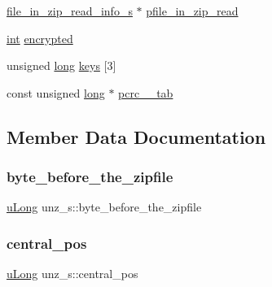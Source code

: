 \begin{DoxyCompactItemize}
\item 
\hyperlink{structfile__in__zip__read__info__s}{file\+\_\+in\+\_\+zip\+\_\+read\+\_\+info\+\_\+s} $\ast$ \hyperlink{structunz__s_a7a5f0568475ad9a36ee2c1f3972406f0}{pfile\+\_\+in\+\_\+zip\+\_\+read}
\item 
\hyperlink{ioapi_8h_a787fa3cf048117ba7123753c1e74fcd6}{int} \hyperlink{structunz__s_ae50c5145b776e6b2d68a078adbb9ad52}{encrypted}
\item 
unsigned \hyperlink{ioapi_8h_a3c7b35ad9dab18b8310343c201f7b27e}{long} \hyperlink{structunz__s_a55d75bacbbaf31b1e796e222c0388f34}{keys} \mbox{[}3\mbox{]}
\item 
const unsigned \hyperlink{ioapi_8h_a3c7b35ad9dab18b8310343c201f7b27e}{long} $\ast$ \hyperlink{structunz__s_a9efa28355c0dec769d07c5a52d70605d}{pcrc\+\_\+\_\+tab}
\end{DoxyCompactItemize}


\subsection{Member Data Documentation}
\mbox{\label{structunz__s_a788688a8021cbbba6a2ac1765edd362e}} 
\subsubsection{\texorpdfstring{byte\+\_\+before\+\_\+the\+\_\+zipfile}{byte\_before\_the\_zipfile}}
{\footnotesize\ttfamily \hyperlink{ioapi_8h_a50e9e9d5c30e481de822ad68fe537986}{u\+Long} unz\+\_\+s\+::byte\+\_\+before\+\_\+the\+\_\+zipfile}

\mbox{\label{structunz__s_a2d8ae4c0975d2057e30b13c3148c27eb}} 
\subsubsection{\texorpdfstring{central\+\_\+pos}{central\_pos}}
{\footnotesize\ttfamily \hyperlink{ioapi_8h_a50e9e9d5c30e481de822ad68fe537986}{u\+Long} unz\+\_\+s\+::central\+\_\+pos}

\mbox{\label{structunz__s_ab1963897ac959ca0f9b4208c573c2795}} 
